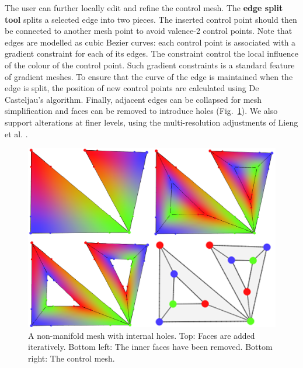 \documentclass{egpubl}
\newcommand{\note}[3]{{\color{#2}\textbf{#1: #3}}}
\newcommand{\unsure}[1]{\note{USIKKER}{Green}{#1}}
\begin{document}
	The user can further locally edit and refine the control mesh. The \textbf{edge split tool} splits a selected edge into two pieces. The inserted control point should then be connected to another mesh point to avoid valence-2 control points. Note that edges are modelled as cubic Bezier curves: each control point is associated with a gradient constraint for each of its edges. The constraint control the local influence of the colour of the control point. Such gradient constraints is a standard feature of gradient meshes. To ensure that the curve of the edge is maintained when the edge is split, the position of new control points are calculated using De Casteljau's algorithm. Finally, adjacent edges can be collapsed for mesh simplification and faces can be removed to introduce holes (Fig.~\ref{fig:nonManifoldHoleMesh}). We also support alterations at finer levels, using the multi-resolution adjustments of Lieng et al. \cite{Lieng:2016}.
	
	
	\begin{figure}[t]
		\centering
		\includegraphics[scale=0.181]{HoleAndNonManifoldMesh.png}
		\caption{A non-manifold mesh with internal holes. Top: Faces are added iteratively. Bottom left: The inner faces have been removed.  Bottom right: The control mesh.}
		\label{fig:nonManifoldHoleMesh}
	\end{figure}
	
\end{document}
